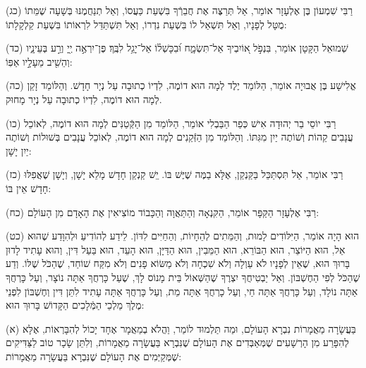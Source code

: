 \documentclass[twoside, openany, parskip=half, 11pt]{book}
\begin{document}
(כג)
רַבִּי שִׁמְעוֹן בֶּן אֶלְעָזָר אוֹמֵר, אַל תְּרַצֶּה אֶת חֲבֵרְֿךָ בִּשְׁעַת כַּעֲסוֹ,
וְאַל תְנַחֲמֶנּוּ בְּשָׁעָה שֶׁמֵּתוֹ מֻטָּל לְפָנָיו,
וְאַל תִּשְׁאַל לוֹ בִּשְׁעַת נִדְרוֹ,
וְאַל תִּשְׁתַּדֵּל לִרְאוֹתוֹ בִּשְׁעַת קַלְקָלָתוֹ:

(כד)
שְׁמוּאֵל הַקָּטָן אוֹמֵר, 
 בִּנְפֹ֣ל א֭וֹיִבְיךָ אַל־תִּשְׂמָ֑ח וּ֝בִכָּשְׁל֗וֹ אַל־יָגֵ֥ל לִבֶּֽךָ׃ פֶּן־יִרְאֶ֣ה יְ֖יָ וְרַ֣ע בְּעֵינָ֑יו וְהֵשִׁ֖יב מֵעָלָ֣יו אַפּֽוֹ:

(כה)
אֱלִישָׁע בֶּן אֲבוּיָה אוֹמֵר, הַלּוֹמֵד יֶלֶד לְמָה הוּא דוֹמֶה, לִדְיוֹ כְתוּבָה עַל נְיָר חָדָשׁ.
וְהַלּוֹמֵד זָקֵן לְמָה הוּא דוֹמֶה, לִדְיוֹ כְתוּבָה עַל נְיָר מָחוּק.

(כו)
רַבִּי יוֹסֵי בַר יְהוּדָה אִישׁ כְּפַר הַבַּבְלִי אוֹמֵר, הַלּוֹמֵד מִן הַקְּֿטַנִּים לְמָה הוּא דוֹמֶה, לְאוֹכֵל עֲנָבִים קֵהוֹת וְשׁוֹתֶה יַיִן מִגִּתּוֹ.
וְהַלּוֹמֵד מִן הַזְּֿקֵנִים לְמָה הוּא דוֹמֶה, לְאוֹכֵל עֲנָבִים בְּשׁוּלוֹת וְשׁוֹתֶה יַיִן יָשָׁן:

(כז)
רַבִּי אוֹמֵר, אַל תִּסְתַּכֵּל בַּקַּנְקַן, אֶלָּא בַמֶּה שֶׁיֶּשׁ בּוֹ. יִֵשׁ קַנְקַן חָדָשׁ מָלֵא יָשָׁן, וְיָשָׁן שֶׁאֲפִלּוּ חָדָשׁ אֵין בּוֹ:

(כח)
רַבִּי אֶלְעָזָר הַקַּפָּר אוֹמֵר, הַקִּנְאָה וְהַתַּאֲוָה וְהַכָּבוֹד מוֹצִיאִין אֶת הָאָדָם מִן הָעוֹלָם:

(כט)
הוּא הָיָה אוֹמֵר, הַיִּלּוֹדִים לָמוּת,
וְהַמֵּתִים לְהֵחָיוֹת,
וְהַחַיִּים לִדּוֹן.
לֵידַע לְהוֹדִיעַ וּלְהִוָּדַע שֶׁהוּא אֵל, הוּא הַיּוֹצֵר, הוּא הַבּוֹרֵא, הוּא הַמֵּבִין, הוּא הַדַּיָּן, הוּא הָעֵד, הוּא בַּעַל דִּין, וְהוּא עָתִיד לָדוּן בָּרוּךְ הוּא, שֶׁאֵין לְפָנָיו לֹא עַוְלָה וְלֹא שִׁכְחָה וְלֹא מַשּׂוֹא פָנִים וְלֹא מִקַּח שׁוֹחַד, שֶׁהַכֹּל שֶׁלּוֹ.
וְדַע שֶׁהַכֹּל לְפִי הַחֶשְׁבּוֹן.
וְאַל יַבְטִיחֲךָ יִצְרֶךָ שֶׁהַשְּׁאוֹל בֵּית מָנוֹס לָךְ, שֶׁעַל כָּרְחֲךָ אַתָּה נוֹצָר,
וְעַל כָּרְחֲךָ אַתָּה נוֹלָד,
וְעַל כָּרְחֲךָ אַתָּה חַי,
וְעַל כָרְחֲךָ אַתָּה מֵת,
וְעַל כָּרְחֲךָ אַתָּה עָתִיד לִתֵּן דִּין וְחֶשְׁבּוֹן לִפְנֵי מֶלֶךְ מַלְכֵי הַמְּֿלָכִים הַקָּדוֹשׁ בָּרוּךְ הוּא:




\kolyisroel

(א)
 בַּעֲשָׂרָה מַאֲמָרוֹת נִבְרָא הָעוֹלָם, וּמַה תַּלְמוּד לוֹמַר, וַהֲלֹא בְמַאֲמָר אֶחָד יָכוֹל לְהִבָּרְאוֹת, אֶלָּא לְהִפָּרַע מִן הָרְשָׁעִים שֶׁמְּאַבְּדִים אֶת הָעוֹלָם שֶׁנִּבְרָא בַּעֲשָׂרָה מַאֲמָרוֹת, וְלִתֵּן שָׂכָר טוֹב לַצַּדִּיקִים שֶׁמְּקַיְּמִים אֶת הָעוֹלָם שֶׁנִּבְרָא בַּעֲשָׂרָה מַאֲמָרוֹת:
\end{document}
